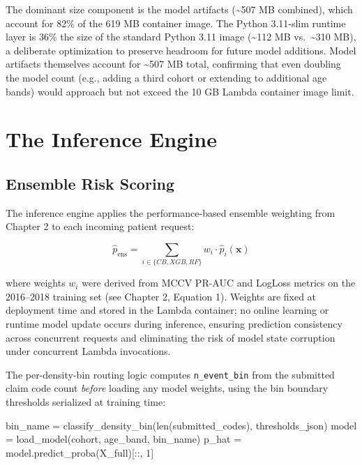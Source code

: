 \documentclass[
  12pt,
]{book}
\newenvironment{Shaded}{\begin{snugshade}}{\end{snugshade}}
\newcommand{\BuiltInTok}[1]{\textcolor[rgb]{0.00,0.23,0.31}{#1}}
\newcommand{\DecValTok}[1]{\textcolor[rgb]{0.68,0.00,0.00}{#1}}
\newcommand{\NormalTok}[1]{\textcolor[rgb]{0.00,0.23,0.31}{#1}}
\newcommand{\OperatorTok}[1]{\textcolor[rgb]{0.37,0.37,0.37}{#1}}
\begin{document}
The dominant size component is the model artifacts (\textasciitilde507
MB combined), which account for 82\% of the 619 MB container image. The
Python 3.11-slim runtime layer is 36\% the size of the standard Python
3.11 image (\textasciitilde112 MB vs.~\textasciitilde310 MB), a
deliberate optimization to preserve headroom for future model additions.
Model artifacts themselves account for \textasciitilde507 MB total,
confirming that even doubling the model count (e.g., adding a third
cohort or extending to additional age bands) would approach but not
exceed the 10 GB Lambda container image limit.

\chapter{The Inference Engine}\label{sec-inference}

\section{Ensemble Risk Scoring}\label{ensemble-risk-scoring}

The inference engine applies the performance-based ensemble weighting
from Chapter 2 to each incoming patient request:

\[\hat{p}_{\text{ens}} = \sum_{i \in \{CB, XGB, RF\}} w_i \cdot \hat{p}_i(\mathbf{x})\]

where weights \(w_i\) were derived from MCCV PR-AUC and LogLoss metrics
on the 2016--2018 training set (see Chapter 2, Equation 1). Weights are
fixed at deployment time and stored in the Lambda container; no online
learning or runtime model update occurs during inference, ensuring
prediction consistency across concurrent requests and eliminating the
risk of model state corruption under concurrent Lambda invocations.

The per-density-bin routing logic computes \texttt{n\_event\_bin} from
the submitted claim code count \emph{before} loading any model weights,
using the bin boundary thresholds serialized at training time:

\begin{Shaded}
\begin{Highlighting}[]
\NormalTok{bin\_name }\OperatorTok{=}\NormalTok{ classify\_density\_bin(}\BuiltInTok{len}\NormalTok{(submitted\_codes), thresholds\_json)}
\NormalTok{model }\OperatorTok{=}\NormalTok{ load\_model(cohort, age\_band, bin\_name)}
\NormalTok{p\_hat }\OperatorTok{=}\NormalTok{ model.predict\_proba(X\_full)[::, }\DecValTok{1}\NormalTok{]}
\end{Highlighting}
\end{Shaded}
\end{document}
